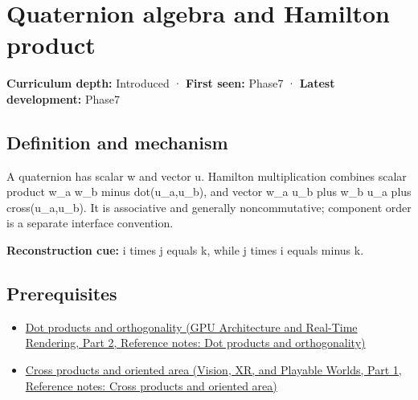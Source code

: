 \hypertarget{appendix-965d9260eeab}{}\label{referencestart:appendix-965d9260eeab}
\section{Quaternion algebra and Hamilton product}\label{appendix-965d9260eeab-quaternion-algebra-and-hamilton-product}

\hypertarget{appendix-965d9260eeab-quaternion-algebra-and-hamilton-product}{}

\textbf{Curriculum depth:} Introduced · \textbf{First seen:} Phase7 · \textbf{Latest development:} Phase7

\begin{allmightroledefinition}

\subsection{Definition and mechanism}\label{appendix-965d9260eeab-definition-and-mechanism}

\hypertarget{appendix-965d9260eeab-definition-and-mechanism}{}

A quaternion has scalar w and vector u. Hamilton multiplication combines scalar product w\_a w\_b minus dot(u\_a,u\_b), and vector w\_a u\_b plus w\_b u\_a plus cross(u\_a,u\_b). It is associative and generally noncommutative; component order is a separate interface convention.

\end{allmightroledefinition}

\textbf{Reconstruction cue:} i times j equals k, while j times i equals minus k.

\subsection{Prerequisites}\label{appendix-965d9260eeab-prerequisites}

\hypertarget{appendix-965d9260eeab-prerequisites}{}

\begin{itemize}
\tightlist
\item
  \href{../06-GPU-Architecture-and-Real-Time-Rendering-P02/main.pdf\#appendix-8bc4e8fc547c}{Dot products and orthogonality (GPU Architecture and Real-Time Rendering, Part 2, Reference notes: Dot products and orthogonality)}
\item
  \href{../07-Vision-XR-and-Playable-Worlds-P01/main.pdf\#appendix-2391db8052b1}{Cross products and oriented area (Vision, XR, and Playable Worlds, Part 1, Reference notes: Cross products and oriented area)}
\end{itemize}

